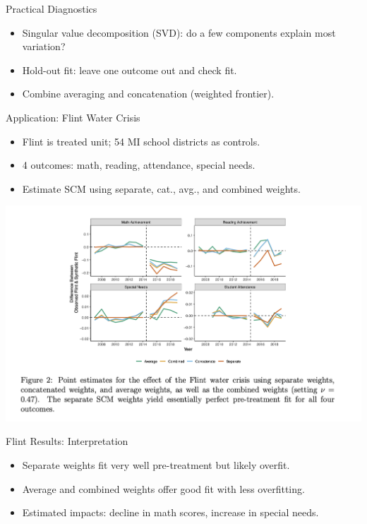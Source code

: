 \documentclass{beamer}
\begin{document}
\begin{frame}{Practical Diagnostics}
  \begin{itemize}
    \item Singular value decomposition (SVD): do a few components explain most variation?
    \item Hold-out fit: leave one outcome out and check fit.
    \item Combine averaging and concatenation (weighted frontier).
  \end{itemize}
\end{frame}

\begin{frame}{Application: Flint Water Crisis}
  \begin{itemize}
    \item Flint is treated unit; 54 MI school districts as controls.
    \item 4 outcomes: math, reading, attendance, special needs.
    \item Estimate SCM using separate, cat., avg., and combined weights.
  \end{itemize}
  \includegraphics[width=0.9\linewidth]{./lecture_includes/figure2_gaps.png}
\end{frame}

\begin{frame}{Flint Results: Interpretation}
  \begin{itemize}
    \item Separate weights fit very well pre-treatment but likely overfit.
    \item Average and combined weights offer good fit with less overfitting.
    \item Estimated impacts: decline in math scores, increase in special needs.
  \end{itemize}
\end{frame}
\end{document}
